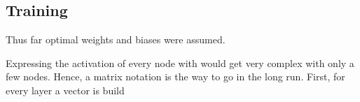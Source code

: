 \subsection{Training}
\label{sec:neural-networks-training}
Thus far optimal weights and biases were assumed.

Expressing the activation of every node with  would get very complex with only a few nodes.
Hence, a matrix notation is the way to go in the long run.
First, for every layer a vector is build